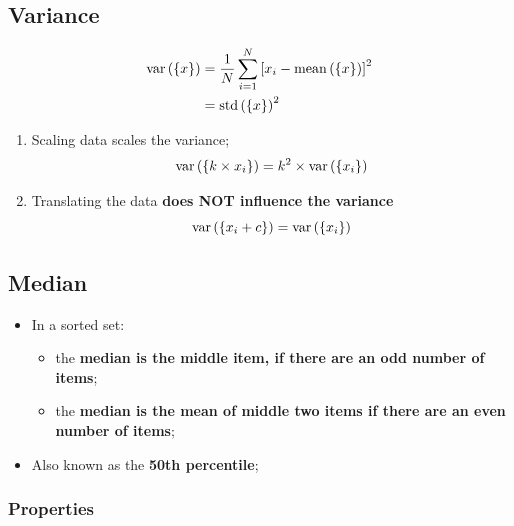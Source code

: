   \subsection{Variance}
  
    \begin{align}
      \operatorname{var}\left( \{ x \} \right) &= \frac{1}{N} \sum_{i = 1}^{N} \left[ x_{i} - \operatorname{mean}\left( \{ x \} \right) \right]^{2} \\
      &= \operatorname{std}\left( \{ x \} \right)^{2}
    \end{align}
    
    \begin{enumerate}
      \item Scaling data scales the variance;
      \begin{equation}
        \operatorname{var} \left( \{ k \times x_{i} \} \right) = k^{2} \times \operatorname{var} \left( \{ x_{i} \} \right)
      \end{equation}

      \item Translating the data \textbf{does NOT influence the variance}
      \begin{equation}
        \operatorname{var} \left( \{ x_{i} + c \} \right) = \operatorname{var} \left( \{ x_{i} \} \right)
      \end{equation}
    \end{enumerate}
    
  \subsection{Median}
      
    \begin{itemize}
      \item In a sorted set:
      \begin{itemize}
        \item the \textbf{median is the middle item, if there are an odd number of items};
        \item the \textbf{median is the mean of middle two items if there are an even number of items};
      \end{itemize}
      
      \item Also known as the \textbf{50th percentile};
    \end{itemize}
    
    \subsubsection{Properties}
    
